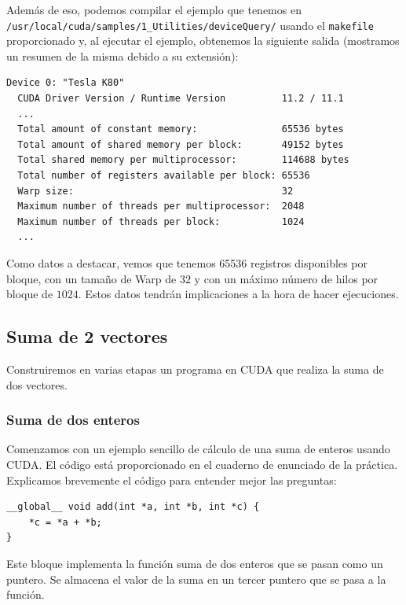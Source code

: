 \documentclass[11pt]{article}
\def\inline{\lstinline[basicstyle=\ttfamily,keywordstyle={}]}
\begin{document}
Además de eso, podemos compilar el ejemplo que tenemos en \\ \lstinline{/usr/local/cuda/samples/1_Utilities/deviceQuery/} usando el \inline{makefile} proporcionado y, al ejecutar el ejemplo, obtenemos la siguiente salida (mostramos un resumen de la misma debido a su extensión):
\begin{verbatim}
Device 0: "Tesla K80"
  CUDA Driver Version / Runtime Version          11.2 / 11.1
  ... 
  Total amount of constant memory:               65536 bytes
  Total amount of shared memory per block:       49152 bytes
  Total shared memory per multiprocessor:        114688 bytes
  Total number of registers available per block: 65536
  Warp size:                                     32
  Maximum number of threads per multiprocessor:  2048
  Maximum number of threads per block:           1024
  ... 
\end{verbatim}


Como datos a destacar, vemos que tenemos 65536 registros disponibles por bloque, con un tamaño de Warp de $32$ y con un máximo número de hilos por bloque de $1024$. Estos datos tendrán implicaciones a la hora de hacer ejecuciones. 


\subsection{Suma de 2 vectores}

Construiremos en varias etapas un programa en CUDA que realiza la suma de dos vectores.

\subsubsection{Suma de dos enteros}

Comenzamos con un ejemplo sencillo de cálculo de una suma de enteros usando CUDA. El código está proporcionado en el cuaderno de enunciado de la práctica. Explicamos brevemente el código para entender mejor las preguntas:

\begin{verbatim}
__global__ void add(int *a, int *b, int *c) {
	*c = *a + *b;
}
\end{verbatim}
Este bloque implementa la función suma de dos enteros que se pasan como un puntero. Se almacena el valor de la suma en un tercer puntero que se pasa a la función.
\end{document}
